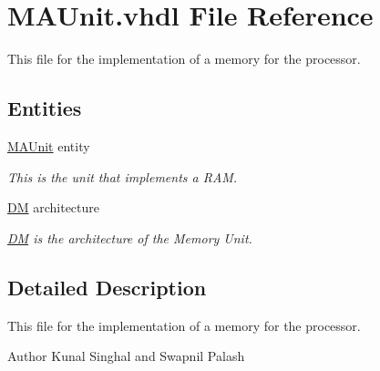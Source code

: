 \hypertarget{_m_a_unit_8vhdl}{\section{M\-A\-Unit.\-vhdl File Reference}
\label{_m_a_unit_8vhdl}
}


This file for the implementation of a memory for the processor.  


\subsection*{Entities}
\begin{DoxyCompactItemize}
\item 
\hyperlink{class_m_a_unit}{M\-A\-Unit} entity
\begin{DoxyCompactList}\small\item\em This is the unit that implements a R\-A\-M. \end{DoxyCompactList}\item 
\hyperlink{class_m_a_unit_1_1_d_m}{D\-M} architecture
\begin{DoxyCompactList}\small\item\em \hyperlink{class_m_a_unit_1_1_d_m}{D\-M} is the architecture of the Memory Unit. \end{DoxyCompactList}\end{DoxyCompactItemize}


\subsection{Detailed Description}
This file for the implementation of a memory for the processor. \begin{DoxyAuthor}{Author}
Kunal Singhal and Swapnil Palash 
\end{DoxyAuthor}
